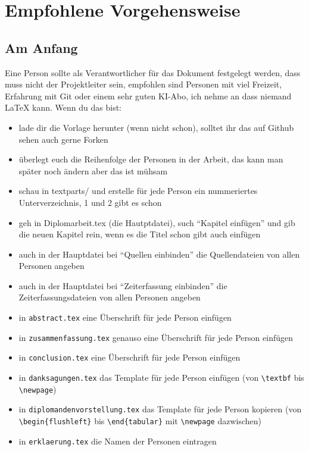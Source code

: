 \section{Empfohlene Vorgehensweise}

\subsection{Am Anfang}

Eine Person sollte als Verantwortlicher für das Dokument festgelegt werden, dass muss nicht der Projektleiter sein, empfohlen sind Personen mit viel Freizeit, Erfahrung mit Git oder einem sehr guten KI-Abo, ich nehme an dass niemand \LaTeX{} kann. Wenn du das bist:
\begin{itemize}
    \item lade dir die Vorlage herunter (wenn nicht schon), solltet ihr das auf Github sehen auch gerne Forken
    \item überlegt euch die Reihenfolge der Personen in der Arbeit, das kann man später noch ändern aber das ist mühsam
    \item schau in textparts/ und erstelle für jede Person ein nummeriertes Unterverzeichnis, 1 und 2 gibt es schon
    \item geh in Diplomarbeit.tex (die Hautptdatei), such ``Kapitel einfügen'' und gib die neuen Kapitel rein, wenn es die Titel schon gibt auch einfügen
    \item auch in der Hauptdatei bei ``Quellen einbinden'' die Quellendateien von allen Personen angeben
    \item auch in der Hauptdatei bei ``Zeiterfassung einbinden'' die Zeiterfassungsdateien von allen Personen angeben
    \item in \verb|abstract.tex| eine Überschrift für jede Person einfügen
    \item in \verb|zusammenfassung.tex| genauso eine Überschrift für jede Person einfügen
    \item in \verb|conclusion.tex| eine Überschrift für jede Person einfügen
    \item in \verb|danksagungen.tex| das Template für jede Person einfügen (von \verb|\textbf| bis \verb|\newpage|)
    \item in \verb|diplomandenvorstellung.tex| das Template für jede Person kopieren (von \verb|\begin{flushleft}| bis \verb|\end{tabular}| mit \verb|\newpage| dazwischen)
    \item in \verb|erklaerung.tex| die Namen der Personen eintragen

\end{itemize}
